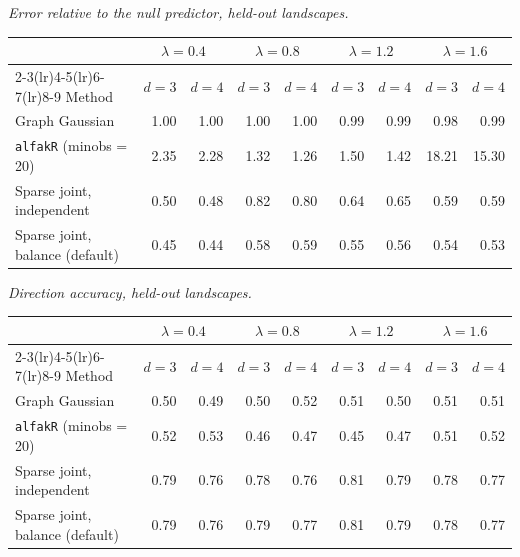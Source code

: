 \par\medskip\noindent\begin{minipage}{\linewidth}
\textit{Error relative to the null predictor, held-out landscapes.}
\begin{center}
\footnotesize
\setlength{\tabcolsep}{3.5pt}
\begin{tabular}{l*{8}{r}}
\toprule
 & \multicolumn{2}{c}{$\lambda=0.4$} & \multicolumn{2}{c}{$\lambda=0.8$} & \multicolumn{2}{c}{$\lambda=1.2$} & \multicolumn{2}{c}{$\lambda=1.6$} \\
\cmidrule(lr){2-3}\cmidrule(lr){4-5}\cmidrule(lr){6-7}\cmidrule(lr){8-9}
Method & $d=3$ & $d=4$ & $d=3$ & $d=4$ & $d=3$ & $d=4$ & $d=3$ & $d=4$ \\
\midrule
Graph Gaussian & 1.00 & 1.00 & 1.00 & 1.00 & 0.99 & 0.99 & 0.98 & 0.99 \\
\texttt{alfakR} (minobs = 20) & 2.35 & 2.28 & 1.32 & 1.26 & 1.50 & 1.42 & 18.21 & 15.30 \\
Sparse joint, independent & 0.50 & 0.48 & 0.82 & 0.80 & 0.64 & 0.65 & 0.59 & 0.59 \\
Sparse joint, balance (default) & 0.45 & 0.44 & 0.58 & 0.59 & 0.55 & 0.56 & 0.54 & 0.53 \\
\bottomrule
\end{tabular}
\end{center}
\end{minipage}

\par\medskip\noindent\begin{minipage}{\linewidth}
\textit{Direction accuracy, held-out landscapes.}
\begin{center}
\footnotesize
\setlength{\tabcolsep}{3.5pt}
\begin{tabular}{l*{8}{r}}
\toprule
 & \multicolumn{2}{c}{$\lambda=0.4$} & \multicolumn{2}{c}{$\lambda=0.8$} & \multicolumn{2}{c}{$\lambda=1.2$} & \multicolumn{2}{c}{$\lambda=1.6$} \\
\cmidrule(lr){2-3}\cmidrule(lr){4-5}\cmidrule(lr){6-7}\cmidrule(lr){8-9}
Method & $d=3$ & $d=4$ & $d=3$ & $d=4$ & $d=3$ & $d=4$ & $d=3$ & $d=4$ \\
\midrule
Graph Gaussian & 0.50 & 0.49 & 0.50 & 0.52 & 0.51 & 0.50 & 0.51 & 0.51 \\
\texttt{alfakR} (minobs = 20) & 0.52 & 0.53 & 0.46 & 0.47 & 0.45 & 0.47 & 0.51 & 0.52 \\
Sparse joint, independent & 0.79 & 0.76 & 0.78 & 0.76 & 0.81 & 0.79 & 0.78 & 0.77 \\
Sparse joint, balance (default) & 0.79 & 0.76 & 0.79 & 0.77 & 0.81 & 0.79 & 0.78 & 0.77 \\
\bottomrule
\end{tabular}
\end{center}
\end{minipage}

